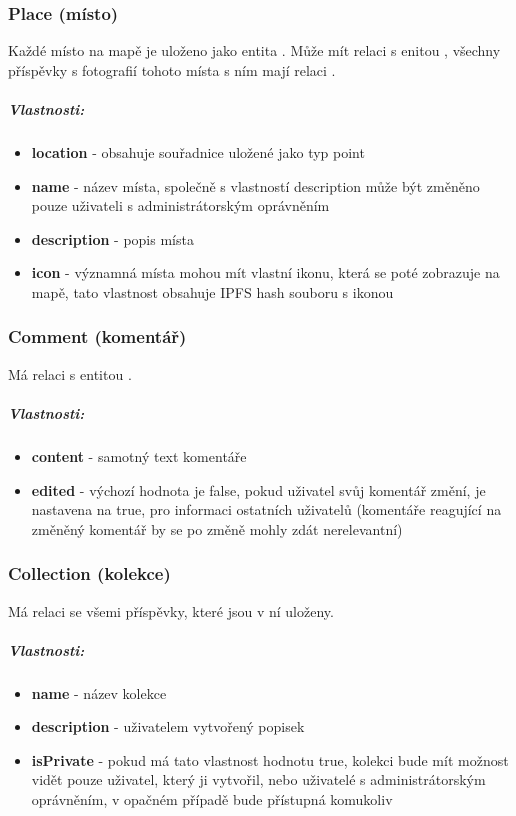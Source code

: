 \documentclass[12pt, a4paper,
 twoside,        %
 openright
]{report}
\newenvironment{propertiesItemize}{
\begin{itemize}{ 
  }}
  {\end{itemize}}
\begin{document}
    	            \subsubsection{Place (místo)} Každé místo na mapě je uloženo jako entita . Může mít relaci  s enitou , všechny příspěvky s fotografií tohoto místa s ním mají relaci .
    	             \subparagraph{Vlastnosti:}  
                           \begin{propertiesItemize}
                                \item \textbf{location} - obsahuje souřadnice uložené jako typ point \cite{Neo4jSparialFunctions}
                                \item \textbf{name} - název místa, společně s vlastností description může být změněno pouze uživateli s administrátorským oprávněním
                                \item \textbf{description} - popis místa
                                \item \textbf{icon} - významná místa mohou mít vlastní ikonu, která se poté zobrazuje na mapě, tato vlastnost obsahuje IPFS hash souboru s ikonou
                        \end{propertiesItemize}
    	            \subsubsection{Comment (komentář)} Má relaci  s entitou .
    	                        \subparagraph{Vlastnosti:}  
                           \begin{propertiesItemize}
                                \item \textbf{content} - samotný text komentáře 
                                \item \textbf{edited} - výchozí hodnota je false, pokud uživatel svůj komentář změní, je nastavena na true, pro informaci ostatních uživatelů (komentáře reagující na změněný komentář by se po změně mohly zdát nerelevantní) 
                        \end{propertiesItemize}
    	            \subsubsection{Collection (kolekce)} Má relaci  se všemi příspěvky, které jsou v ní uloženy. 
	                        \subparagraph{Vlastnosti:}  
                           \begin{propertiesItemize}
                                \item \textbf{name} - název kolekce
                                \item \textbf{description} - uživatelem vytvořený popisek 
                                \item \textbf{isPrivate} - pokud má tato vlastnost hodnotu true, kolekci bude mít možnost vidět pouze uživatel, který ji vytvořil, nebo uživatelé s administrátorským oprávněním, v opačném případě bude přístupná komukoliv
                        \end{propertiesItemize}
  
\end{document}
